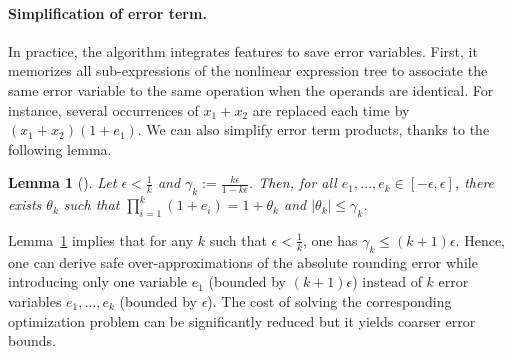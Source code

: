 \documentclass[preprint]{sigplanconf}
\newtheorem{lemma}[theorem]{Lemma}
\theoremstyle{plain}
\begin{document}
\paragraph{Simplification of error term.}
%
In practice, the algorithm integrates features to save error variables. First, it memorizes all sub-expressions of the nonlinear expression tree to associate  the same error variable to the same operation when the operands are identical. For instance, several occurrences of $x_1 + x_2$ are replaced each time by $(x_1 + x_2) (1 + e_1)$.
We can also simplify error term products, thanks to the following lemma.
\begin{lemma}[]
\label{th:redproduct}
Let $\epsilon < \frac{1}{k}$ and $\gamma_k := \frac{k \epsilon}{1 - k \epsilon}$. Then, for all $e_1, \dots, e_k \in [-\epsilon, \epsilon]$, there exists $\theta_k$ such that ${\displaystyle \prod_{i=1}^k (1 + e_i) = 1 + \theta_k}$ and $\mid \theta_k \mid \leq \gamma_k$.
\end{lemma}
Lemma~\ref{th:redproduct} implies that for any $k$ such that $\epsilon < \frac{1}{k}$, one has $\gamma_k \leq (k + 1) \epsilon$. Hence, one can derive safe over-approximations of the absolute rounding error while introducing only one variable $e_1$ (bounded by $(k + 1) \epsilon$) instead of $k$ error variables $e_1, \dots, e_k$ (bounded by $\epsilon$). The cost of solving the corresponding optimization problem can be significantly reduced but it yields coarser error bounds.
%
\end{document}
